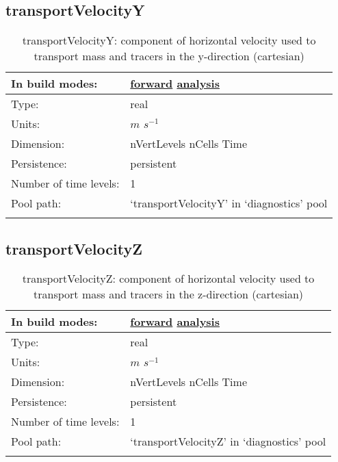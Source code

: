 \subsection[transportVelocityY]{transportVelocityY}
\label{subsec:var_sec_diagnostics_transportVelocityY}
\begin{center}
\begin{longtable}{| p{2.0in} | p{4.0in} |}
        \hline 
        In build modes: & \hyperref[subsec:forward_var_tab_diagnostics]{forward} \hyperref[subsec:analysis_var_tab_diagnostics]{analysis} \\
        \hline 
        Type: & real \\
        \hline 
        Units: & $m$ $s^{-1}$ \\
        \hline 
        Dimension: & nVertLevels nCells Time \\
        \hline 
        Persistence: & persistent \\
        \hline 
        Number of time levels: & 1 \\
        \hline 
            Pool path: & `transportVelocityY' in `diagnostics' pool \\
		 \hline 
    \caption{transportVelocityY: component of horizontal velocity used to transport mass and tracers in the y-direction (cartesian)}
\end{longtable}
\end{center}
\subsection[transportVelocityZ]{transportVelocityZ}
\label{subsec:var_sec_diagnostics_transportVelocityZ}
\begin{center}
\begin{longtable}{| p{2.0in} | p{4.0in} |}
        \hline 
        In build modes: & \hyperref[subsec:forward_var_tab_diagnostics]{forward} \hyperref[subsec:analysis_var_tab_diagnostics]{analysis} \\
        \hline 
        Type: & real \\
        \hline 
        Units: & $m$ $s^{-1}$ \\
        \hline 
        Dimension: & nVertLevels nCells Time \\
        \hline 
        Persistence: & persistent \\
        \hline 
        Number of time levels: & 1 \\
        \hline 
            Pool path: & `transportVelocityZ' in `diagnostics' pool \\
		 \hline 
    \caption{transportVelocityZ: component of horizontal velocity used to transport mass and tracers in the z-direction (cartesian)}
\end{longtable}
\end{center}
